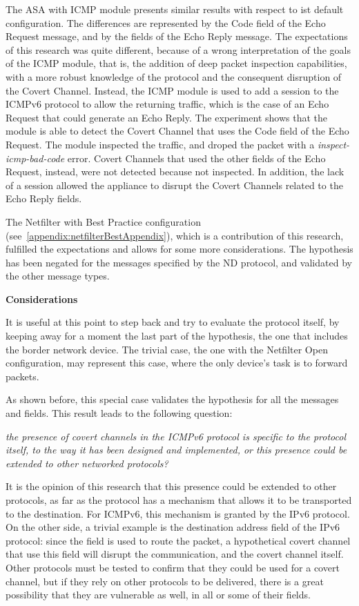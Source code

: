 \documentclass[12pt]{article}
\begin{document}
The ASA with ICMP module presents similar results with respect to ist default configuration. The differences are represented by the Code field of the Echo Request message, and by the fields of the Echo Reply message. The expectations of this research was quite different, because of a wrong interpretation of the goals of the ICMP module, that is, the addition of deep packet inspection capabilities, with a more robust knowledge of the protocol and the consequent disruption of the Covert Channel. Instead, the ICMP module is used to add a session to the ICMPv6 protocol to allow the returning traffic, which is the case of an Echo Request that could generate an Echo Reply. The experiment shows that the module is able to detect the Covert Channel that uses the Code field of the Echo Request. The module inspected the traffic, and droped the packet with a \textit{inspect-icmp-bad-code} error. Covert Channels that used the other fields of the Echo Request, instead, were not detected because not inspected. In addition, the lack of a session allowed the appliance to disrupt the Covert Channels related to the Echo Reply fields.

The Netfilter with Best Practice configuration (see~\cref{appendix:netfilterBestAppendix}), which is a contribution of this research, fulfilled the expectations and allows for some more considerations. The hypothesis has been negated for the messages specified by the ND protocol, and validated by the other message types.

\textbf{Considerations}

It is useful at this point to step back and try to evaluate the protocol itself, by keeping away for a moment the last part of the hypothesis, the one that includes the border network device. The trivial case, the one with the Netfilter Open configuration, may represent this case, where the only device's task is to forward packets.

As shown before, this special case validates the hypothesis for all the messages and fields. This result leads to the following question:

\textit{the presence of covert channels in the ICMPv6 protocol is specific to the protocol itself, to the way it has been designed and implemented, or this presence could be extended to other networked protocols?}

It is the opinion of this research that this presence could be extended to other protocols, as far as the protocol has a mechanism that allows it to be transported to the destination. For ICMPv6, this mechanism is granted by the IPv6 protocol. On the other side, a trivial example is the destination address field of the IPv6 protocol: since the field is used to route the packet, a hypothetical covert channel that use this field will disrupt the communication, and the covert channel itself. Other protocols must be tested to confirm that they could be used for a covert channel, but if they rely on other protocols to be delivered, there is a great possibility that they are vulnerable as well, in all or some of their fields.
\end{document}

